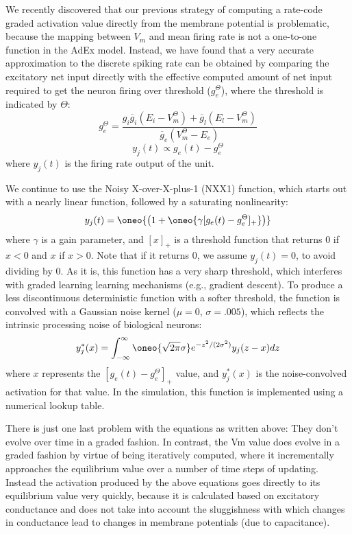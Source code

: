 We recently discovered that our previous strategy of computing a rate-code graded activation value directly from the membrane potential is problematic, because the mapping between $V_m$ and mean firing rate is not a one-to-one function in the AdEx model. Instead, we have found that a very accurate approximation to the discrete spiking rate can be obtained by comparing the excitatory net input directly with the effective computed amount of net input required to get the neuron firing over threshold ($g_e^{\Theta}$), where the threshold is indicated by $\Theta$:
\begin{equation}
g_e^{\Theta} = \frac{g_i \overline{g}_i (E_i - V_m^{\Theta}) +
 \overline{g}_l(E_l - V_m^{\Theta})} {\overline{g}_e (V_m^{\Theta} - E_e)}
\end{equation}
\begin{equation}
 y_j(t) \propto g_e(t) - g_e^{\Theta}
\end{equation}
where $y_j(t)$ is the firing rate output of the unit.

We continue to use the Noisy X-over-X-plus-1 (NXX1) function, which starts out with a nearly linear function, followed by a saturating nonlinearity:
\begin{equation}
 y_j(t) = \oneo{\left(1 + \oneo{\gamma [g_e(t) - g_e^{\Theta}]_+} \right)}
\end{equation}
where $\gamma$ is a gain parameter, and $[x]_+$ is a threshold function that returns 0 if $x<0$ and $x$ if $x>0$. Note that if it returns 0, we assume $y_j(t) = 0$, to avoid dividing by 0. As it is, this function has a very sharp threshold, which interferes with graded learning learning mechanisms (e.g., gradient descent). To produce a less discontinuous deterministic function with a softer threshold, the function is convolved with a Gaussian noise kernel ($\mu=0$, $\sigma=.005$), which reflects the intrinsic processing noise of biological neurons:
\begin{equation}
 y^*_j(x) = \int_{-\infty}^{\infty} \oneo{\sqrt{2 \pi} \sigma}
 e^{-z^2/(2 \sigma^2)} y_j(z-x) dz
 \label{eq.conv}
\end{equation}
where $x$ represents the $[g_e(t) - g_e^{\Theta}]_+$ value, and $y^*_j(x)$ is the noise-convolved activation for that value. In the simulation, this function is implemented using a numerical lookup table.

There is just one last problem with the equations as written above: They don't evolve over time in a graded fashion.  In contrast, the Vm value does evolve in a graded fashion by virtue of being iteratively computed, where it incrementally approaches the equilibrium value over a number of time steps of updating.  Instead the activation produced by the above equations goes directly to its equilibrium value very quickly, because it is calculated based on excitatory conductance and does not take into account the sluggishness with which changes in conductance lead to changes in membrane potentials (due to capacitance).


